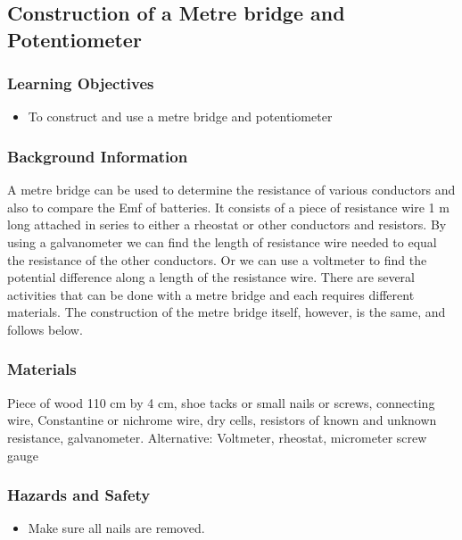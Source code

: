 



\subsection{Construction of a Metre bridge and Potentiometer}

\subsubsection*{Learning Objectives}
\begin{itemize}
\item{To construct and use a metre bridge and potentiometer} 
\end{itemize}

\subsubsection*{Background Information}
A metre bridge can be used to determine the resistance of various conductors and also to compare the Emf of batteries. It consists of a piece of resistance wire 1 m long attached in series to either a rheostat or other conductors and resistors. By using a galvanometer we can find the length of resistance wire needed to equal the resistance of the other conductors. Or we can use a voltmeter to find the potential difference along a length of the resistance wire. There are several activities that can be done with a metre bridge and each requires different materials. The construction of the metre bridge itself, however, is the same, and follows below.

\subsubsection*{Materials}
Piece of wood 110 cm by 4 cm, shoe tacks or small nails or screws, connecting wire, Constantine or nichrome wire, dry cells, resistors of known and unknown resistance, galvanometer. Alternative: Voltmeter, rheostat, micrometer screw gauge

\subsubsection*{Hazards and Safety}
\begin{itemize}
\item{Make sure all nails are removed.} 
\end{itemize}


